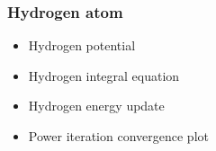 \begin{frame}
  \frametitle{Hydrogen atom}
  \begin{itemize}
    \item Hydrogen potential
    \item Hydrogen integral equation
    \item Hydrogen energy update
    \item Power iteration convergence plot
  \end{itemize}
\end{frame}

%
%
%
%
%
%
%
%
%

